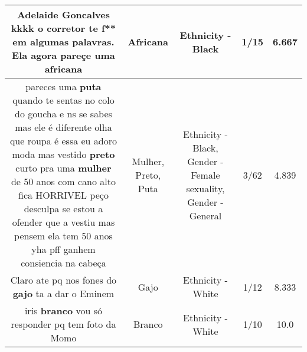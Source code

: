 \documentclass[11pt]{article}
\newlength\mylength
\begin{document}
\begin{center}
\begin{longtable}{|C{.65\mylength}|C{.30\mylength}|C{.12\mylength}|C{.12\mylength}|C{.12\mylength}|}
  \small Adelaide Goncalves kkkk o corretor te f** em algumas palavras.   Ela agora pareçe uma africana\normalsize   & Africana & Ethnicity - Black & 1/15 & 6.667 \\  \hline
  \small pareces uma \textbf{puta} quando te sentas no colo do goucha e ns se sabes mas ele é diferente olha que roupa é essa eu adoro moda mas vestido \textbf{preto} curto pra uma \textbf{mulher} de 50 anos com cano alto fica HORRIVEL peço desculpa se estou a ofender que a vestiu mas pensem ela tem 50 anos yha pff ganhem consiencia na cabeça\normalsize   & Mulher, Preto, Puta & Ethnicity - Black, Gender - Female sexuality, Gender - General & 3/62 & 4.839 \\  \hline
  \small Claro ate pq nos fones do \textbf{gajo} ta a dar o Eminem\normalsize   & Gajo & Ethnicity - White & 1/12 & 8.333 \\  \hline
  \small iris \textbf{branco} vou só responder pq tem foto da Momo\normalsize   & Branco & Ethnicity - White & 1/10 & 10.0 \\  \hline
  
\end{longtable}
\end{center}
\end{document}
